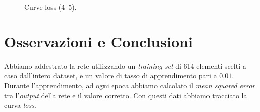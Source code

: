 \documentclass[a4paper,12pt]{article}
\begin{document}
\begin{figure}[htp]
  \centering

  \medskip


  \caption{Curve loss (4--5).}
  \label{fig:loss3}
\end{figure}



\newpage
\section{Osservazioni e Conclusioni} %

Abbiamo addestrato la rete utilizzando un \emph{training set} di 614 elementi scelti a caso dall'intero dataset, e un valore di tasso di apprendimento pari a $0.01$. Durante l'apprendimento, ad ogni epoca abbiamo calcolato il \emph{mean squared error} tra l'\emph{output} della rete e il valore corretto. Con questi dati abbiamo tracciato la curva \emph{loss}.
\end{document}

